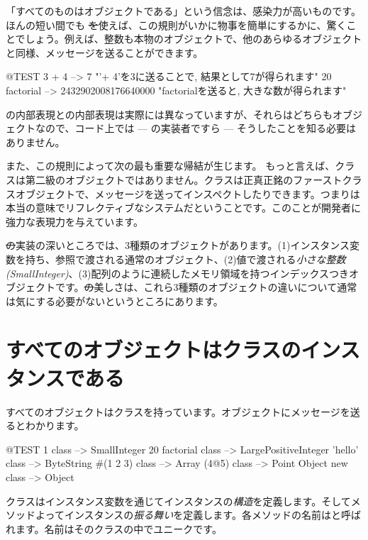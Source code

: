 \documentclass[a4paper,10pt,twoside]{book}
\begin{document}

「すべてのものはオブジェクトである」という信念は、感染力が高いものです。ほんの短い間でも \st を使えば、この規則がいかに物事を簡単にするかに、驚くことでしょう。例えば、整数も本物のオブジェクトで、他のあらゆるオブジェクトと同様、メッセージを送ることができます。

\begin{code}{@TEST}
3 + 4            --> 7    "'+ 4'を3に送ることで, 結果として7が得られます"
20 factorial  --> 2432902008176640000   "factorialを送ると, 大きな数が得られます"
\end{code}

の内部表現との内部表現は実際には異なっていますが、それらはどちらもオブジェクトなので、コード上では --- の実装者ですら --- そうしたことを知る必要はありません。

また、この規則によって次の最も重要な帰結が生じます。
もっと言えば、クラスは第二級のオブジェクトではありません。クラスは正真正銘のファーストクラスオブジェクトで、メッセージを送ってインスペクトしたりできます。つまり\pharo は本当の意味でリフレクティブなシステムだということです。このことが開発者に強力な表現力を与えています。

\st の実装の深いところでは、3種類のオブジェクトがあります。(1)インスタンス変数を持ち、参照で渡される通常のオブジェクト、(2)値で渡される\emph{小さな整数(SmallInteger)}、(3)配列のように連続したメモリ領域を持つインデックスつきオブジェクトです。\st の美しさは、これら3種類のオブジェクトの違いについて通常は気にする必要がないというところにあります。

\section{すべてのオブジェクトはクラスのインスタンスである}


すべてのオブジェクトはクラスを持っています。オブジェクトにメッセージを送るとわかります。

\begin{code}{@TEST}
1 class                 --> SmallInteger
20 factorial class --> LargePositiveInteger
'hello' class          --> ByteString
#(1 2 3) class       --> Array
(4@5) class         --> Point
Object new class --> Object
\end{code}

クラスはインスタンス変数を通じてインスタンスの\emph{構造}を定義します。そしてメソッドよってインスタンスの\emph{振る舞い}を定義します。各メソッドの名前はと呼ばれます。名前はそのクラスの中でユニークです。
\end{document}
